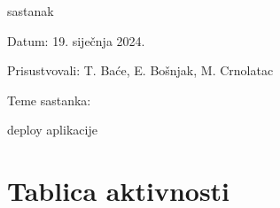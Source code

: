 \begin{packed_enum}
			\item  sastanak
			\item[] \begin{packed_item}
				\item Datum: 19. siječnja 2024.
				\item Prisustvovali: T. Baće, E. Bošnjak, M. Crnolatac
				\item Teme sastanka:
				\begin{packed_item}
					\item  deploy aplikacije
				\end{packed_item}
			\end{packed_item}
			
		\end{packed_enum}
		
		\eject
		\section*{Tablica aktivnosti}

